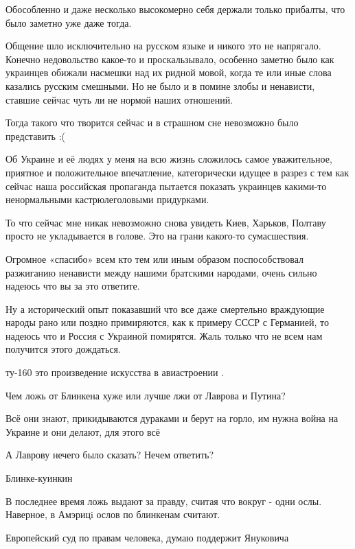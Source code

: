 \begin{itemize}
\begin{multicols}{2}
Обособленно и даже несколько высокомерно себя держали только прибалты, что было
заметно уже даже тогда. 

Общение шло исключительно на русском языке и никого это не напрягало. Конечно
недовольство какое-то и проскальзывало, особенно заметно было как украинцев
обижали насмешки над их ридной мовой, когда те или иные слова казались русским
смешными. Но не было и в помине злобы и ненависти, ставшие сейчас чуть ли не
нормой наших отношений.

Тогда такого что творится сейчас и в страшном сне невозможно было представить
:(

Об Украине и её людях у меня на всю жизнь сложилось самое уважительное,
приятное и положительное впечатление, категорически идущее в разрез с тем как
сейчас наша российская пропаганда пытается показать украинцев какими-то
ненормальными  кастрюлеголовыми придурками. 

То что сейчас мне никак невозможно снова увидеть Киев, Харьков, Полтаву просто
не укладывается в голове. Это на грани какого-то сумасшествия. 

Огромное «спасибо» всем кто тем или иным образом поспособствовал разжиганию
ненависти между нашими братскими народами, очень сильно надеюсь что вы за это
ответите. 

Ну а исторический опыт показавший что все даже смертельно враждующие народы
рано или поздно примиряются, как к примеру СССР с Германией, то надеюсь что и
Россия с Украиной помирятся. Жаль только что не всем нам получится этого
дождаться.


ту-160 это произведение искусства в авиастроении .

\endgroup

\end{multicols}

Чем ложь от Блинкена хуже или лучше лжи от Лаврова и Путина?

Всё они знают, прикидываются дураками и берут на горло, им нужна война на Украине и они делают, для этого всё

А Лаврову нечего было сказать? Нечем ответить?

Блинке-куинкин

В последнее время ложь выдают за правду, считая что вокруг - одни ослы. Наверное, в Амэрицi ослов по блинкенам считают.

Европейский суд по правам человека, думаю поддержит Януковича


\end{itemize}
